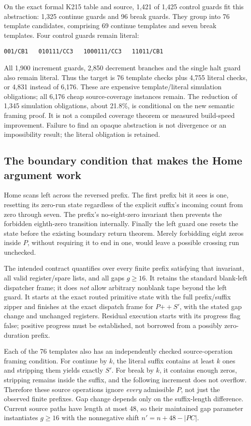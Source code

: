 \documentclass[11pt]{article}
\begin{document}
On the exact formal K215 table and source, 1,421 of 1,425 control guards fit this abstraction: 1,325 continue guards and 96 break guards. They group into 76 template candidates, comprising 69 continue templates and seven break templates. Four control guards remain literal:
\begin{verbatim}
001/CB1   010111/CC3   1000111/CC3   11011/CB1
\end{verbatim}
All 1,900 increment guards, 2,850 decrement branches and the single halt guard also remain literal. Thus the target is 76 template checks plus 4,755 literal checks, or 4,831 instead of 6,176. These are expensive template/literal simulation obligations; all 6,176 cheap source-coverage instances remain. The reduction of 1,345 simulation obligations, about 21.8\%, is conditional on the new semantic framing proof. It is not a compiled coverage theorem or measured build-speed improvement. Failure to find an opaque abstraction is not divergence or an impossibility result; the literal obligation is retained.

\subsection{The boundary condition that makes the Home argument work}
Home scans left across the reversed prefix. The first prefix bit it sees is one, resetting its zero-run state regardless of the explicit suffix's incoming count from zero through seven. The prefix's no-eight-zero invariant then prevents the forbidden eighth-zero transition internally. Finally the left guard one resets the state before the existing boundary return theorem. Merely forbidding eight zeros inside $P$, without requiring it to end in one, would leave a possible crossing run unchecked.

The intended contract quantifies over every finite prefix satisfying that invariant, all valid register/spare lists, and all gaps $g\geq16$. It retains the standard blank-left dispatcher frame; it does \emph{not} allow arbitrary nonblank tape beyond the left guard. It starts at the exact routed primitive state with the full prefix/suffix zipper and finishes at the exact dispatch frame for $P\mathbin{+\!+}S'$, with the stated gap change and unchanged registers. Residual execution starts with its progress flag false; positive progress must be established, not borrowed from a possibly zero-duration prefix.

Each of the 76 templates also has an independently checked source-operation framing condition. For continue by $k$, the literal suffix contains at least $k$ ones and stripping them yields exactly $S'$. For break by $k$, it contains enough zeros, stripping remains inside the suffix, and the following increment does not overflow. Therefore these source operations ignore \emph{every} admissible $P$, not just the observed finite prefixes. Gap change depends only on the suffix-length difference. Current source paths have length at most 48, so their maintained gap parameter instantiates $g\geq16$ with the nonnegative shift $n'=n+48-|PC|$.
\end{document}
